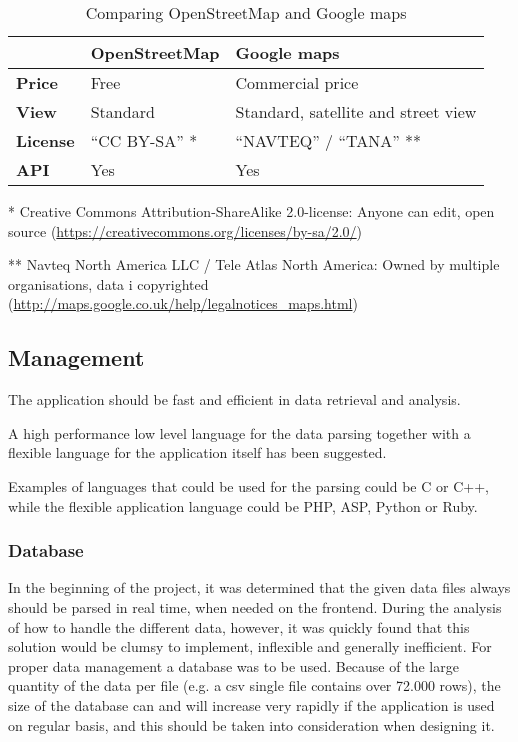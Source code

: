 \begin{table}[htbp]
\centering
\begin{tabular}{| l | l | l |}
\hline
& \textbf{OpenStreetMap} & \textbf{Google maps} \\
\hline
\textbf{Price} & Free & Commercial price \\
\hline
\textbf{View} & Standard & Standard, satellite and street view \\
\hline
\textbf{License} & ``CC BY-SA'' * & ``NAVTEQ'' / ``TANA'' ** \\
\hline
\textbf{API} & Yes & Yes \\
\hline
\end{tabular}
\caption{Comparing OpenStreetMap and Google maps}
\label{tab:osm_vs_google}
\end{table}
* Creative Commons Attribution-ShareAlike 2.0-license: Anyone can edit, open source (\url{https://creativecommons.org/licenses/by-sa/2.0/})

** Navteq North America LLC / Tele Atlas North America: Owned by multiple organisations, data i copyrighted (\url{http://maps.google.co.uk/help/legalnotices_maps.html})

\subsection{Management}
\label{sec:management}
The application should be fast and efficient in data retrieval and analysis.

A high performance low level language for the data parsing together with a flexible language for the application itself has been suggested.

Examples of languages that could be used for the parsing could be C or C++, while the flexible application language could be PHP, ASP, Python or Ruby.

\subsubsection{Database}
\label{sec:database}
In the beginning of the project, it was determined that the given data files always should be parsed in real time, when needed on the frontend. During the analysis of how to handle the different data, however, it was quickly found that this solution would be clumsy to implement, inflexible and generally inefficient.
For proper data management a database was to be used. Because of the large quantity of the data per file (e.g. a csv single file contains over 72.000 rows), the size of the database can and will increase very rapidly if the application is used on regular basis, and this should be taken into consideration when designing it.

